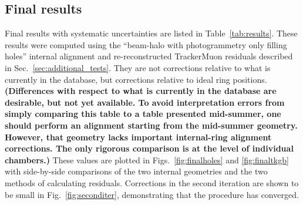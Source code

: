 \documentclass[12pt]{article}
\begin{document}
\subsection{Final results}

Final results with systematic uncertainties are listed in
Table~\ref{tab:results}.  These results were computed using the
``beam-halo with photogrammetry only filling holes'' internal
alignment and re-reconstructed TrackerMuon residuals described in
Sec.~\ref{sec:additional_tests}.  They are not corrections relative to
what is currently in the database, but corrections relative to ideal
ring positions.  {\bf (Differences with respect to what is currently
  in the database are desirable, but not yet available.  To avoid
  interpretation errors from simply comparing this table to a table
  presented mid-summer, one should perform an alignment starting from
  the mid-summer geometry.  However, that geometry lacks important
  internal-ring alignment corrections.  The only rigorous comparison
  is at the level of individual chambers.)}  These values are plotted
in Figs.~\ref{fig:finalholes} and \ref{fig:finaltkgb} with
side-by-side comparisons of the two internal geometries and the two
methods of calculating residuals.  Corrections in the second iteration
are shown to be small in Fig.~\ref{fig:seconditer}, demonstrating that
the procedure has converged.
\end{document}
